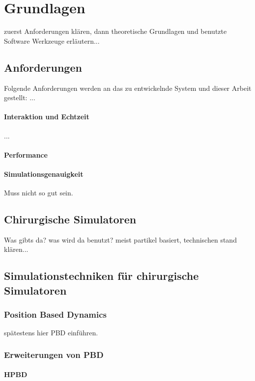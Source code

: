 \chapter{Grundlagen}
zuerst Anforderungen klären, dann theoretische Grundlagen und benutzte Software Werkzeuge erläutern...

\section{Anforderungen}
\label{sec_Anforderungen}
Folgende Anforderungen werden an das zu entwickelnde System und dieser Arbeit gestellt: ...

\subsubsection{Interaktion und Echtzeit}
...

\subsubsection{Performance}

\subsubsection{Simulationsgenauigkeit}
Muss nicht so gut sein.

\section{Chirurgische Simulatoren}
Was gibts da? was wird da benutzt? meist partikel basiert, technischen stand klären...

\section{Simulationstechniken für chirurgische Simulatoren}
\subsection{Position Based Dynamics}
\label{section_PBD}


spätestens hier \ac{PBD} einführen.




\subsection{Erweiterungen von PBD}
\subsubsection{HPBD}

